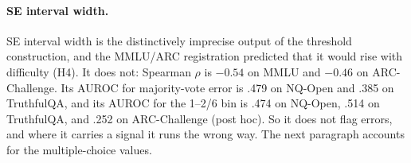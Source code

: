 \paragraph{SE interval width.} SE interval width is the distinctively imprecise output of the threshold construction, and the MMLU/ARC registration predicted that it would rise with difficulty (H4). It does not: Spearman $\rho$ is $-0.54$ on MMLU and $-0.46$ on ARC-Challenge. Its AUROC for majority-vote error is .479 on NQ-Open and .385 on TruthfulQA, and its AUROC for the 1--2/6 bin is .474 on NQ-Open, .514 on TruthfulQA, and .252 on ARC-Challenge (post hoc). So it does not flag errors, and where it carries a signal it runs the wrong way. The next paragraph accounts for the multiple-choice values.
